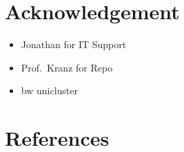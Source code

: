 \documentclass[
]{article}
\providecommand{\tightlist}{%
  \setlength{\itemsep}{0pt}\setlength{\parskip}{0pt}}\usepackage{longtable,booktabs,array}
\begin{document}
\section{Acknowledgement}\label{acknowledgement}

\begin{itemize}
\tightlist
\item
  Jonathan for IT Support
\item
  Prof.~Kranz for Repo
\item
  bw unicluster
\end{itemize}

\newpage{}

\section{References}\label{references}
\end{document}
